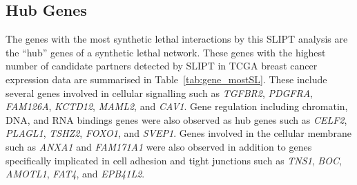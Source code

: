 \FloatBarrier

\subsection{Hub Genes}

The genes with the most synthetic lethal interactions by this SLIPT analysis are the ``hub'' genes of a synthetic lethal network. These genes with the highest number of candidate partners detected by SLIPT in TCGA breast cancer expression data are summarised in Table~\ref{tab:gene_mostSL}.  These include several genes involved in cellular signalling such as \textit{TGFBR2}, \textit{PDGFRA}, \textit{FAM126A}, \textit{KCTD12}, \textit{MAML2}, and \textit{CAV1}. Gene regulation including chromatin, DNA, and RNA bindings genes were also observed as hub genes such as \textit{CELF2}, \textit{PLAGL1}, \textit{TSHZ2}, \textit{FOXO1}, and \textit{SVEP1}. Genes involved in the cellular membrane such as \textit{ANXA1} and \textit{FAM171A1} were also observed in addition to genes specifically implicated in cell adhesion and tight junctions such as \textit{TNS1}, \textit{BOC}, \textit{AMOTL1}, \textit{FAT4}, and \textit{EPB41L2}.

